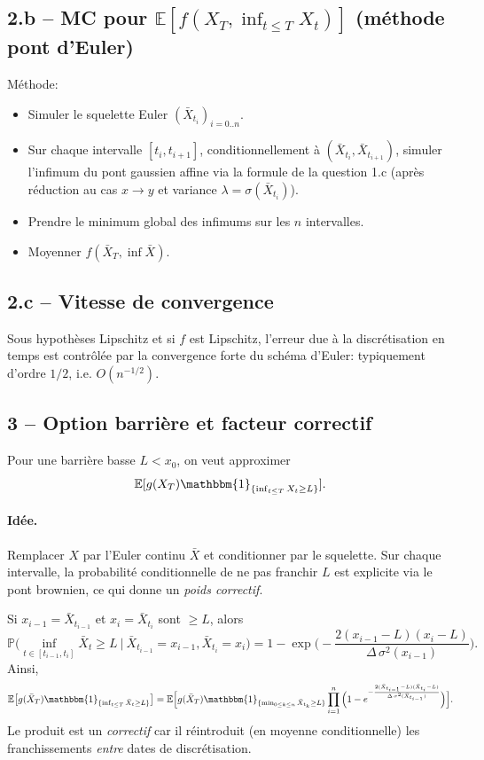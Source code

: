 \documentclass[11pt,a4paper]{article}
\newcommand{\E}{\mathbb{E}}
\newcommand{\Pp}{\mathbb{P}}
\newcommand{\1}{\mathbbm{1}}
\theoremstyle{plain}
\theoremstyle{definition}
\begin{document}
\subsection{2.b -- MC pour $\E[f(X_T,\inf_{t\le T}X_t)]$ (méthode pont d'Euler)}
Méthode:
\begin{itemize}[leftmargin=*]
  \item Simuler le squelette Euler $(\bar X_{t_i})_{i=0..n}$.
  \item Sur chaque intervalle $[t_i,t_{i+1}]$, conditionnellement à $(\bar X_{t_i},\bar X_{t_{i+1}})$, simuler l'infimum du pont gaussien affine via la formule de la question 1.c (après réduction au cas $x\to y$ et variance $\lambda=\sigma(\bar X_{t_i})$).
  \item Prendre le minimum global des infimums sur les $n$ intervalles.
  \item Moyenner $f(\bar X_T,\inf \bar X)$.
\end{itemize}

\subsection{2.c -- Vitesse de convergence}
Sous hypothèses Lipschitz et si $f$ est Lipschitz, l'erreur due à la discrétisation en temps est contrôlée par la convergence forte du schéma d'Euler: typiquement d'ordre $1/2$, i.e. $O(n^{-1/2})$.

\subsection{3 -- Option barrière et facteur correctif}
Pour une barrière basse $L<x_0$, on veut approximer
\[
\E[g(X_T)\1_{\{\inf_{t\le T}X_t\ge L\}}].
\]
\paragraph{Idée.}
Remplacer $X$ par l'Euler continu $\bar X$ et conditionner par le squelette. Sur chaque intervalle, la probabilité conditionnelle de ne pas franchir $L$ est explicite via le pont brownien, ce qui donne un \emph{poids correctif}.
\medskip

Si $x_{i-1}=\bar X_{t_{i-1}}$ et $x_i=\bar X_{t_i}$ sont $\ge L$, alors
\[
\Pp\Big(\inf_{t\in[t_{i-1},t_i]}\bar X_t\ge L\ \big|\ \bar X_{t_{i-1}}=x_{i-1},\bar X_{t_i}=x_i\Big)
=1-\exp\!\Big(-\frac{2(x_{i-1}-L)(x_i-L)}{\Delta\,\sigma^2(x_{i-1})}\Big).
\]
Ainsi,
\[
\E\big[g(\bar X_T)\1_{\{\inf_{t\le T}\bar X_t\ge L\}}\big]
=\E\Big[g(\bar X_T)\1_{\{\min_{0\le k\le n}\bar X_{t_k}\ge L\}}\prod_{i=1}^n\Big(1-e^{-\frac{2(\bar X_{t_{i-1}}-L)(\bar X_{t_i}-L)}{\Delta\,\sigma^2(\bar X_{t_{i-1}})}}\Big)\Big].
\]
Le produit est un \emph{correctif} car il réintroduit (en moyenne conditionnelle) les franchissements \emph{entre} dates de discrétisation.
\end{document}
